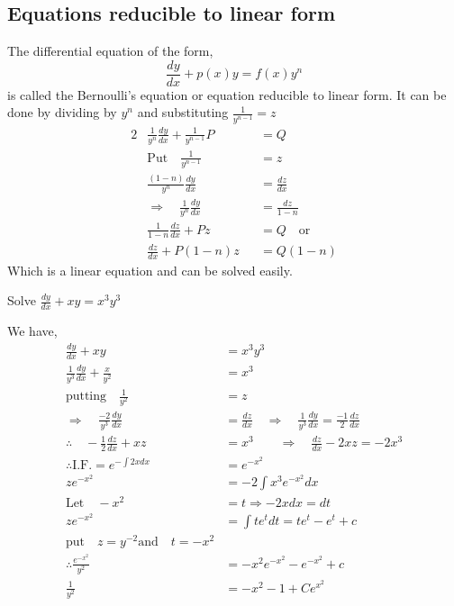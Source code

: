 \subsection{Equations reducible to linear form}
The differential equation of the form,
$$\frac{dy}{dx}+p(x)y=f(x)y^{n}$$is called the Bernoulli's equation or equation reducible to linear form.
It can be done by dividing by $y^{n}$ and substituting $\frac{1}{y^{n-1}}=z$
\begin{alignat*}{2}
&\frac{1}{y^{n}} \frac{d y}{d x}+\frac{1}{y^{n-1}} P&&=Q\\&\text{Put}\quad \frac{1}{y^{n-1}}&&=z\\&\frac{(1-n)}{y^{n}} \frac{d y}{d x}&&=\frac{d z}{d x} \\ &\Rightarrow \quad \frac{1}{y^{n}} \frac{d y}{d x}&&=\frac{d z}{1-n}\\
&\frac{1}{1-n} \frac{d z}{d x}+P z&&=Q \quad \text{or}\\& \frac{d z}{d x}+P(1-n) z&&=Q(1-n)
\end{alignat*}
Which is a linear equation and can be solved easily.
\begin{exercise}
	Solve $\frac{d y}{d x}+x y=x^{3} y^{3}$
\end{exercise}
\begin{answer}We have,
	\begin{align*}
\frac{d y}{d x}+x y&=x^{3} y^{3}\\
\frac{1}{y^{3}} \frac{d y}{d x}+\frac{x}{y^{2}}&=x^{3}\\
	\text{putting}\quad \frac{1}{y^{2}}&=z \\\Rightarrow \quad \frac{-2}{y^{3}} \frac{d y}{d x}&=\frac{d z}{d x} \quad \Rightarrow \quad \frac{1}{y^{3}} \frac{d y}{d x}=\frac{-1}{2} \frac{d z}{d x}\\\therefore \quad-\frac{1}{2} \frac{d z}{d x}+x z&=x^{3} \qquad\Rightarrow \quad \frac{d z}{d x}-2 x z=-2 x^{3}\\
	\mathrm{\therefore I.F.}=e^{-\int 2 x d x}&=e^{-x^{2}}\\
	z e^{-x^{2}}&=-2 \int x^{3} e^{-x^{2}} d x\\
	\text{Let}\quad  -x^{2}&=t \Rightarrow-2 x d x=d t\\
	z e^{-x^{2}}&=\int t e^{t} d t=t e^{t}-e^{t}+c\\
	\text{put}\quad z=y^{-2} \text{and}\quad t=-x^{2}\\
	\therefore \frac{e^{-x^{2}}}{y^{2}}&=-x^{2} e^{-x^{2}}-e^{-x^{2}}+c\\
	\frac{1}{y^{2}}&=-x^{2}-1+C e^{x^{2}}
	\end{align*}
\end{answer}
